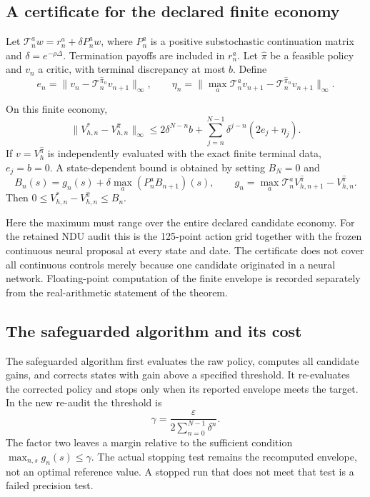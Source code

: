 \subsection{A certificate for the declared finite economy}
Let $\mathcal T_n^a w=r_n^a+\delta P_n^aw$, where $P_n^a$ is a positive substochastic continuation matrix and $\delta=e^{-\rho\Delta}$. Termination payoffs are included in $r_n^a$. Let $\widehat\pi$ be a feasible policy and $v_n$ a critic, with terminal discrepancy at most $b$. Define
\[
 e_n=\|v_n-\mathcal T_n^{\widehat\pi_n}v_{n+1}\|_\infty,\qquad
 \eta_n=\|\max_a\mathcal T_n^av_{n+1}-\mathcal T_n^{\widehat\pi_n}v_{n+1}\|_\infty.
\]
\begin{theorem}\label{r8:finite}
On this finite economy,
\begin{equation}
 \|V_{h,n}^*-V_{h,n}^{\widehat\pi}\|_\infty
 \leq 2\delta^{N-n}b+\sum_{j=n}^{N-1}\delta^{j-n}(2e_j+\eta_j).\label{r8:finitebound}
\end{equation}
If $v=V_h^{\widehat\pi}$ is independently evaluated with the exact finite terminal data, $e_j=b=0$. A state-dependent bound is obtained by setting $B_N=0$ and
\[
 B_n(s)=g_n(s)+\delta\max_a(P_n^aB_{n+1})(s),\qquad
 g_n=\max_a\mathcal T_n^aV_{h,n+1}^{\widehat\pi}-V_{h,n}^{\widehat\pi}.
\]
Then $0\leq V_{h,n}^*-V_{h,n}^{\widehat\pi}\leq B_n$.
\end{theorem}
Here the maximum must range over the entire declared candidate economy. For the retained NDU audit this is the 125-point action grid together with the frozen continuous neural proposal at every state and date. The certificate does not cover all continuous controls merely because one candidate originated in a neural network. Floating-point computation of the finite envelope is recorded separately from the real-arithmetic statement of the theorem.

\subsection{The safeguarded algorithm and its cost}
The safeguarded algorithm first evaluates the raw policy, computes all candidate gains, and corrects states with gain above a specified threshold. It re-evaluates the corrected policy and stops only when its reported envelope meets the target. In the new re-audit the threshold is
\begin{equation}
 \gamma=\frac{\varepsilon}{2\sum_{n=0}^{N-1}\delta^n}.\label{r8:threshold}
\end{equation}
The factor two leaves a margin relative to the sufficient condition $\max_{n,s}g_n(s)\leq\gamma$. The actual stopping test remains the recomputed envelope, not an optimal reference value. A stopped run that does not meet that test is a failed precision test.

